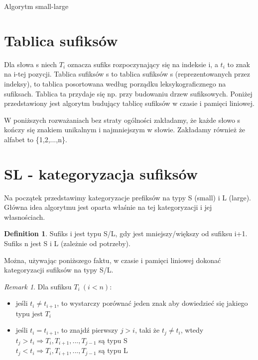 \documentclass[
12pt
]{article}
\theoremstyle{definition}
\newtheorem{definition}{Definition}
\theoremstyle{remark}
\newtheorem*{remark}{Remark}
\begin{document}
\begin{center}
\Huge Algorytm small-large
\end{center}


\section*{Tablica sufiksów}
Dla słowa s niech $T_i$ oznacza sufiks rozpoczynający się na indeksie i, a $t_i$ to znak na i-tej pozycji. Tablica sufiksów s to tablica sufiksów s (reprezentowanych przez indeksy), to tablica posortowana według porządku leksykograficznego na sufiksach. Tablica ta przydaje się np. przy budowaniu drzew sufiksowych. Poniżej przedstawiony jest algorytm budujący tablicę sufiksów w czasie i pamięci liniowej.

W poniższych rozważaniach bez straty ogólności zakładamy, że każde słowo s kończy się znakiem unikalnym i najmniejszym w słowie. Zakładamy również że alfabet to \{1,2,...,n\}.

\section*{SL - kategoryzacja sufiksów}

Na początek przedstawimy kategoryzacje prefiksów na typy S (small) i L (large). Główna idea algorytmu jest oparta właśnie na tej kategoryzacji i jej własnościach.

\begin{definition}
Sufiks i jest typu S/L, gdy jest mniejszy/większy od sufiksu i+1. Sufiks n jest S i L (zależnie od potrzeby).
\end{definition}

Można, używając poniższego faktu, w czasie i pamięci liniowej dokonać kategoryzacji sufiksów na typy S/L.

\begin{remark}
Dla sufiksu $T_i \ (i<n)$:

\begin{itemize}
\item jeśli $t_i \neq t_{i+1}$, to wystarczy porównać jeden znak aby dowiedzieć się jakiego typu jest $T_i$
\item
jeśli $t_{i} = t_{i+1}$, to znajdź pierwszy $j > i$, taki że $t_j \neq t_i$, wtedy \\
$ t_j > t_i \Rightarrow T_i,T_{i+1},...,T_{j-1}$ są typu S \\
$ t_j < t_i \Rightarrow T_i,T_{i+1},...,T_{j-1}$ są typu L
\end{itemize}

\end{remark}
\end{document}

